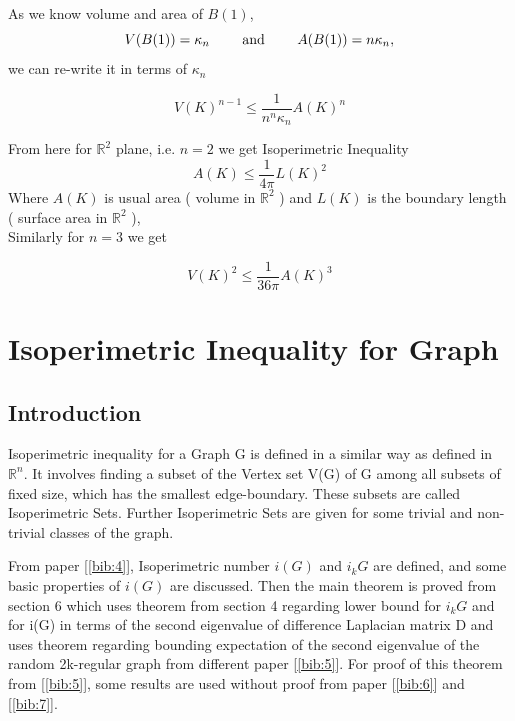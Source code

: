 \documentclass[oneside]{book}
\begin{document}
	As we know volume and area of $B(1)$, 
	$$V(B(1))=\kappa_{n} \text{  \quad \quad and \quad \quad   } A(B(1))=n \kappa_{n},$$
	we can re-write it  in terms of $\kappa_{n}$
	
	\[
	V(K)^{n-1} \leq \frac{1}{n^{n} \kappa_{n}} A(K)^{n}
	\]
	\hfill \break
	
	From here for $\mathbb{R}^{2}$ plane, i.e. $n=2$ we get Isoperimetric Inequality  
	\[
	A(K) \leq \frac{1}{4 \pi} L(K)^{2}
	\]
	Where  $A(K)$ is usual  area ( volume in $\mathbb{R}^{2}$ ) and $L(K)$ is the boundary length \newline  ( surface area in $\mathbb{R}^{2}$ ), \\
	
	Similarly  for $n=3$
	we get
	
	\[
	V(K)^{2} \leq \frac{1}{36 \pi} A(K)^{3}
	\]
	
	
	
	
	
	
	
	
	
	
	
	
	\chapter{Isoperimetric Inequality for Graph}
	\label{chap:c5}
	\section{Introduction}
	\label{s:5}
	
	Isoperimetric inequality for a Graph G is defined in a similar way as defined in $\mathbb{R}^n$. It involves finding a subset of the Vertex set V(G) of G among all subsets of fixed size, which has the smallest edge-boundary. These subsets are called Isoperimetric Sets. Further  Isoperimetric Sets are given for some trivial and non-trivial classes of the graph. \par 
	From paper [\ref{bib:4}], Isoperimetric number $i(G)$ and $i_k{G}$ are defined, and some basic properties of $i(G)$  are discussed. Then the main theorem  is proved from section 6 which uses theorem from section 4 regarding lower bound for $i_k{G}$ and for i(G) in terms of the second eigenvalue of difference Laplacian matrix D and uses theorem regarding bounding expectation of the second eigenvalue of the random 2k-regular graph from different paper [\ref{bib:5}]. For proof of this theorem from [\ref{bib:5}], some results are used without proof from paper [\ref{bib:6}] and [\ref{bib:7}].
	
\end{document}
